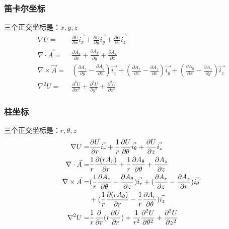 \subsubsection{笛卡尔坐标}
三个正交坐标是：$x, y, z$
\begin{subequations}\label{eqn:field cart}
	\begin{align}
\nabla U=&\frac{\partial U}{\partial x}\vec{i_x} +\frac{\partial U}{\partial y}\vec{i_y}+\frac{\partial U}{\partial z}\vec{i_z}  \\
\nabla\cdot \vec{A}=& \frac{\partial{A_x}}{\partial x} +\frac{\partial{A_y}}{\partial y}+\frac{\partial{A_z}}{\partial z}\\
\nabla\times \vec{A}=& (\frac{\partial{A_z}}{\partial y} -\frac{\partial{A_y}}{\partial z})\vec{i_x} + (\frac{\partial{A_x}}{\partial z} -\frac{\partial{A_z}}{\partial x}) \vec{i_y}
+ (\frac{\partial{A_y}}{\partial x} -\frac{\partial{A_x}}{\partial y})\vec{i_z} \\
\nabla^2 U=&\frac{\partial^2 U}{\partial x^2}+\frac{\partial^2 U}{\partial y^2}+\frac{\partial^2 U}{\partial z^2}
  	\end{align}
\end{subequations}

\subsubsection{柱坐标}
三个正交坐标是：$r, \theta, z$
\begin{subequations}\label{eqn:field cyl}
	\begin{align}
\nabla U=&\frac{\partial U}{\partial r}\vec{i_r} +\frac{1}{r}\frac{\partial U}{\partial \theta}\vec{i_{\theta}}+\frac{\partial U}{\partial z}\vec{i_z} \\
\nabla\cdot \vec{A} =& \frac{1}{r}\frac{\partial{(r A_r)}}{\partial r} +\frac{1}{r}\frac{\partial{A_\theta}}{\partial \theta}+\frac{\partial{A_z}}{\partial z} \\
\nabla\times \vec{A}=& (\frac{1}{r}\frac{\partial{A_z}}{\partial \theta} -\frac{\partial{A_\theta}}{\partial z})\vec{i_r} + (\frac{\partial{A_r}}{\partial z} -\frac{\partial{A_z}}{\partial r}) \vec{i_\theta} \notag\\
&+ (\frac{1}{r}\frac{\partial{(r A_\theta)}}{\partial r} -\frac{1}{r}\frac{\partial{A_r}}{\partial \theta})\vec{i_z}\\
\nabla^2 U=&\frac{1}{r}\frac{\partial}{\partial r}(r\frac{\partial U}{\partial r})+\frac{1}{r^2}\frac{\partial^2 U}{\partial \theta^2}+\frac{\partial^2 U}{\partial z^2}
  	\end{align}
\end{subequations}

